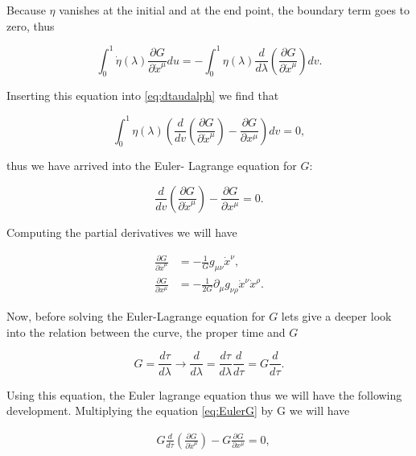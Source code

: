         Because $\eta$ vanishes at the initial and at the end point, the boundary term goes to zero, thus

        \begin{equation}
            \int_0^1\Dot{\eta}(\lambda)\frac{\partial G}{\partial \Dot{x}^{\mu}}du = - \int_0^1\eta(\lambda)\frac{d}{d\lambda}\left(\frac{\partial G}{\partial \Dot{x}^{\mu}} \right)dv.
        \end{equation}

        Inserting this equation into \ref{eq:dtaudalph} we find that

        \begin{equation}
            \int_0^1 \eta(\lambda)\left(\frac{d}{dv}\left(\frac{\partial G}{\partial \Dot{x}^{\mu}}\right) -\frac{\partial G}{\partial x^{\mu}} \right)dv= 0,
        \end{equation}

        thus we have arrived into the Euler- Lagrange equation for $G$:

        \begin{equation}\label{eq:EulerG}
            \frac{d}{dv}\left(\frac{\partial G}{\partial \Dot{x}^{\mu}}\right) -\frac{\partial G}{\partial x^{\mu}} = 0.
        \end{equation}

        Computing the partial derivatives we will have

        \begin{align}
            \frac{\partial G}{\partial \Dot{x}^{\mu}} &= - \frac{1}{G}g_{\mu\nu}\Dot{x}^{\nu},\\
            \frac{\partial G}{\partial x^{\mu}} &= -\frac{1}{2G}\partial_{\mu}g_{\nu\rho}\Dot{x}^{\nu}\Dot{x}^{\rho}.
        \end{align}

        Now, before solving the Euler-Lagrange equation for $G$ lets give a deeper look into the relation between the curve, the proper time and $G$

        \begin{equation}
            G = \frac{d\tau}{d\lambda} \rightarrow \frac{d}{d\lambda} = \frac{d\tau}{d\lambda}\frac{d}{d\tau} = G\frac{d}{d\tau}.
        \end{equation}

        Using this equation, the Euler lagrange equation thus we will have the following development. Multiplying the equation \ref{eq:EulerG} by G we will have

        \begin{align*}
            &G\frac{d}{d\tau}\left(\frac{\partial G}{\partial \Dot{x}^{\mu}} \right) - G\frac{\partial G}{\partial x^{\mu}}=0,
        \end{align*}

